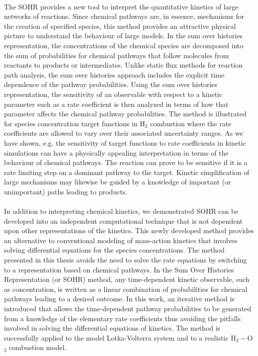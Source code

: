 \paragraph{}
The SOHR provides a new tool to interpret the quantitative kinetics of large networks
of reactions. Since chemical pathways are, in essence, mechanisms for the creation
of specified species, this method provides an attractive physical picture to
understand the behaviour of large models. In the sum over histories representation, the concentrations of the chemical species are
decomposed into the sum of probabilities for chemical pathways that follow
molecules from reactants to products or intermediates. Unlike static flux
methods for reaction path analysis, the sum over histories approach includes the
explicit time dependence of the pathway probabilities. Using the sum over
histories representation, the sensitivity of an observable with respect to a kinetic
parameter such as a rate coefficient is then analyzed in terms of how that
parameter affects the chemical pathway probabilities. The method is illustrated
for species concentration target functions in H$_2$ combustion where the rate
coefficients are allowed to vary over their associated uncertainty ranges. As we have shown, e.g. the sensitivity of
target functions to rate coefficients in kinetic simulations can have a physically appealing
interpretation in terms of the behaviour of chemical pathways. The reaction can
prove to be sensitive if it is a rate limiting step on a dominant pathway to the target.
Kinetic simplification\cite{ch1_IRPC_67_skodje2001geometrical,ch1_IRPC_68_law2003development,ch1_IRPC_69_maas1992simplifying} of large mechanisms may likewise be guided by a
knowledge of important (or unimportant) paths leading to products.
\newline
\paragraph{}
In addition to interpreting chemical kinetics, we demonstrated SOHR can be developed into an
independent computational technique that is not dependent upon other representations 
of the kinetics. This newly developed method provides an alternative to conventional modeling of mass-action kinetics that involves solving differential equations for the species concentrations.  The method presented in this thesis avoids the need to solve the rate equations by switching to a representation based on chemical pathways.  In the Sum Over Histories Representation (or SOHR) method, any time-dependent kinetic observable, such as concentration, is written as a linear combination of probabilities for chemical pathways leading to a desired outcome.  In this work, an iterative method is introduced that allows the time-dependent pathway probabilities to be generated from a knowledge of the elementary rate coefficients thus avoiding the pitfalls involved in solving the differential equations of kinetics.  The method is successfully applied to the model Lotka-Volterra system and to a realistic H$_2-$O$_2$ combustion model.